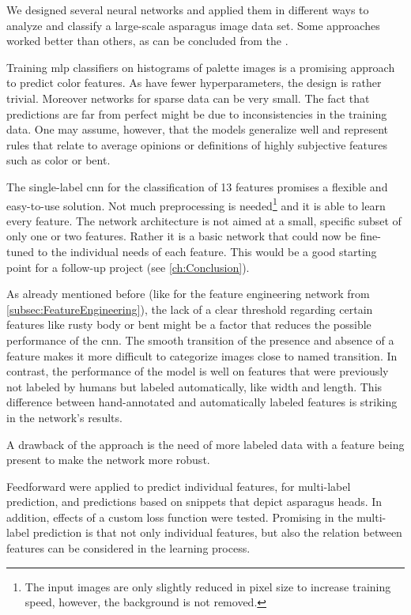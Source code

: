 We designed several neural networks and applied them in different ways to analyze and classify a large-scale asparagus image data set. Some approaches worked better than others, as can be concluded from the .

\bigskip
Training \acrshort{mlp} classifiers on histograms of palette images is a promising approach to predict color features. As  have fewer hyperparameters, the design is rather trivial. Moreover networks for sparse data can be very small. The fact that predictions are far from perfect might be due to inconsistencies in the training data. One may assume, however, that the models generalize well and represent rules that relate to average opinions or definitions of highly subjective features such as color or bent.

\bigskip
The single-label \acrshort{cnn} for the classification of 13 features promises a flexible and easy-to-use solution. Not much preprocessing is needed\footnote{The input images are only slightly reduced in pixel size to increase training speed, however, the background is not removed.} and it is able to learn every feature. The network architecture is not aimed at a small, specific subset of only one or two features. Rather it is a basic network that could now be fine-tuned to the individual needs of each feature. This would be a good starting point for a follow-up project (see \autoref{ch:Conclusion}).

As already mentioned before (like for the feature engineering network from \autoref{subsec:FeatureEngineering}), the lack of a clear threshold regarding certain features like rusty body or bent might be a factor that reduces the possible performance of the \acrshort{cnn}. The smooth transition of the presence and absence of a feature makes it more difficult to categorize images close to named transition. In contrast, the performance of the model is well on features that were previously not labeled by humans but labeled automatically, like width and length. This difference between hand-annotated and automatically labeled features is striking in the network’s results.

A drawback of the approach is the need of more labeled data with a feature being present to make the network more robust.

\bigskip
Feedforward  were applied to predict individual features, for multi-label prediction, and predictions based on snippets that depict asparagus heads. In addition, effects of a custom loss function were tested. Promising in the multi-label prediction is that not only individual features, but also the relation between features can be considered in the learning process.

